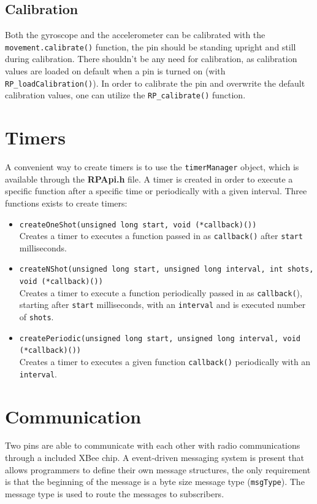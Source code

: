 \documentclass[a4paper, twoside, final]{book}%
\begin{document}
\subsection{Calibration}

Both the gyroscope and the accelerometer can be calibrated with the \texttt{movement.calibrate()} function, the pin should be standing upright and still during calibration.
There shouldn't be any need for calibration, as calibration values are loaded on default when a pin is turned on (with \texttt{RP\_loadCalibration()}).
In order to calibrate the pin and overwrite the default calibration values, one can utilize the \texttt{RP\_calibrate()} function.

\section{Timers}
A convenient way to create timers is to use the \texttt{timerManager} object, which is available through the \textbf{RPApi.h} file.
A timer is created in order to execute a specific function after a specific time or periodically with a given interval.
Three functions exists to create timers:

\begin{itemize}
  \item \texttt{createOneShot(unsigned long start, void (*callback)())}\\
    Creates a timer to executes a function passed in as \texttt{callback()} after \texttt{start} milliseconds.
  \item \texttt{createNShot(unsigned long start, unsigned long interval, int shots, void (*callback)())}\\
    Creates a timer to execute a function periodically passed in as \texttt{callback(}), starting after \texttt{start} milliseconds, with an \texttt{interval} and is executed number of \texttt{shots}.
  \item \texttt{createPeriodic(unsigned long start, unsigned long interval, void (*callback)())}\\
    Creates a timer to executes a given function \texttt{callback()} periodically with an \texttt{interval}.
\end{itemize}

\section{Communication}

Two pins are able to communicate with each other with radio communications through a included XBee chip. 
A event-driven messaging system is present that allows programmers to define their own message structures, the only requirement is that the beginning of 
the message is a byte size message type (\texttt{msgType}). The message type is used to route the messages to subscribers.
\end{document}
